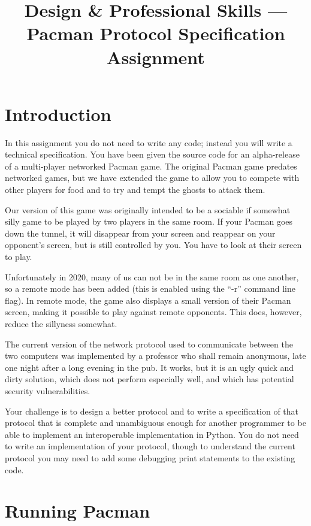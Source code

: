 \documentclass{article}
\title{Design \& Professional Skills --- Pacman Protocol Specification Assignment}
\author{}
\date{}
\begin{document}
\maketitle

\section{Introduction}

In this assignment you do not need to write any code; instead you will
write a technical specification.  You have been given the source code
for an alpha-release of a multi-player networked Pacman game.  The
original Pacman game predates networked games, but we have extended
the game to allow you to compete with other players for food and to
try and tempt the ghosts to attack them.

Our version of this game was originally intended to be a sociable if
somewhat silly game to be played by two players in the same room. If
your Pacman goes down the tunnel, it will disappear from your screen
and reappear on your opponent's screen, but is still controlled by
you.  You have to look at their screen to play.

Unfortunately in 2020, many of us can not be in the same room as
one another, so a remote mode has been added (this is enabled using
the ``-r'' command line flag).  In remote mode, the game also displays a
small version of their Pacman screen, making it possible to play
against remote opponents. This does, however, reduce the sillyness somewhat.

The current version of the network protocol used to communicate between the
two computers was implemented by a professor who shall remain
anonymous, late one night after a long evening in the pub.  It works,
but it is an ugly quick and dirty solution, which does not perform
especially well, and which has potential security vulnerabilities.

Your challenge is to design a better protocol and to write a
specification of that protocol that is complete and unambiguous enough
for another programmer to be able to implement an interoperable
implementation in Python.  You do not need to write an implementation of your
protocol, though to understand the current protocol you may need to
add some debugging print statements to the existing code.

\section{Running Pacman}
\end{document}
